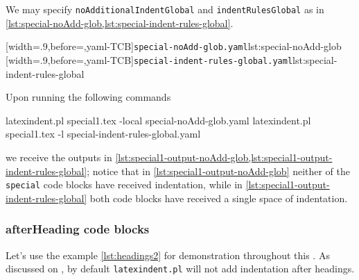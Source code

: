\documentclass[10pt]{article}
\begin{document}
 \begin{example}
 We may specify \texttt{noAdditionalIndentGlobal} and \texttt{indentRulesGlobal} as in
 \cref{lst:special-noAdd-glob,lst:special-indent-rules-global}.

 \begin{cmhtcbraster}
  [width=.9\linewidth,before=\centering,yaml-TCB]{\texttt{special-noAdd-glob.yaml}}{lst:special-noAdd-glob}
  [width=.9\linewidth,before=\centering,yaml-TCB]{\texttt{special-indent-rules-global.yaml}}{lst:special-indent-rules-global}
 \end{cmhtcbraster}

 Upon running the following commands 

 \begin{commandshell}
latexindent.pl special1.tex -local special-noAdd-glob.yaml  
latexindent.pl special1.tex -l special-indent-rules-global.yaml  
\end{commandshell}

 we receive the outputs in
 \cref{lst:special1-output-noAdd-glob,lst:special1-output-indent-rules-global}; notice
 that in \cref{lst:special1-output-noAdd-glob} neither of the \texttt{special} code
 blocks have received indentation, while in
 \cref{lst:special1-output-indent-rules-global} both code blocks have received a single
 space of indentation.

 \begin{cmhtcbraster}
 \end{cmhtcbraster}
 \end{example}
\subsubsection{afterHeading code blocks}\label{subsubsec-headings-no-add-indent-rules}
 Let's use the example \cref{lst:headings2} for demonstration throughout this
 . As discussed on
 , by default \texttt{latexindent.pl} will not add indentation
 after headings.
\end{document}
